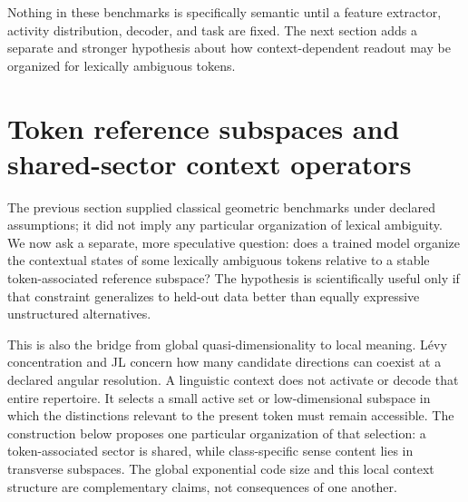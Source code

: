 \documentclass[
  aps,
  reprint,
  superscriptaddress,
  floatfix,
  nofootinbib,
  longbibliography
]{revtex4-2}
\begin{document}
Nothing in these benchmarks is specifically semantic until a feature
extractor, activity distribution, decoder, and task are fixed.  The next
section adds a separate and stronger hypothesis about how context-dependent
readout may be organized for lexically ambiguous tokens.

\section{Token reference subspaces and shared-sector context operators}
\label{sec:reference}

The previous section supplied classical geometric benchmarks under declared
assumptions; it did not imply any particular organization of lexical ambiguity.  We now
ask a separate, more speculative question: does a trained model organize the
contextual states of some lexically ambiguous tokens relative to a stable
token-associated reference subspace?  The hypothesis is scientifically useful
only if that constraint generalizes to held-out data better than equally
expressive unstructured alternatives.

This is also the bridge from global quasi-dimensionality to local meaning.
L\'evy concentration and JL concern how many candidate directions can coexist
at a declared angular resolution.  A linguistic context does not activate or
decode that entire repertoire.  It selects a small active set or low-dimensional subspace in
which the distinctions relevant to the present token must remain accessible.
The construction below proposes one particular organization of that selection:
a token-associated sector is shared, while class-specific sense content lies
in transverse subspaces.  The global exponential code size and this local
context structure are complementary claims, not consequences of one another.
\end{document}
